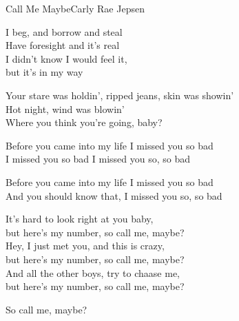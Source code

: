 \begin{song}{Call Me Maybe}{Carly Rae Jepsen}
\begin{guitar}
I beg, and borrow and steal\\
Have foresight and it's real\\
I didn't know I would feel it,\\
but it's in my way\\
\end{guitar}

\begin{guitar}
Your stare was holdin', ripped jeans, skin was showin'\\
Hot night, wind was blowin'\\
Where you think you're going, baby?\\
\end{guitar}


\begin{guitar}
Before you came into my life I missed you so bad\\
I missed you so bad I missed you so, so bad\\
\end{guitar}

\begin{guitar}
Before you came into my life I missed you so bad\\
And you should know that, I missed you so, so bad\\
\end{guitar}

\begin{guitar}
It's hard to look right at you baby,\\
but here's my number, so call me, maybe?\\
Hey, I just met you, and this is crazy,\\
but here's my number, so call me, maybe?\\
And all the other boys, try to chaase me,\\
but here's my number, so call me, maybe?\\
\end{guitar}


\begin{guitar}
So call me, maybe?\\
\end{guitar}


\end{song}
